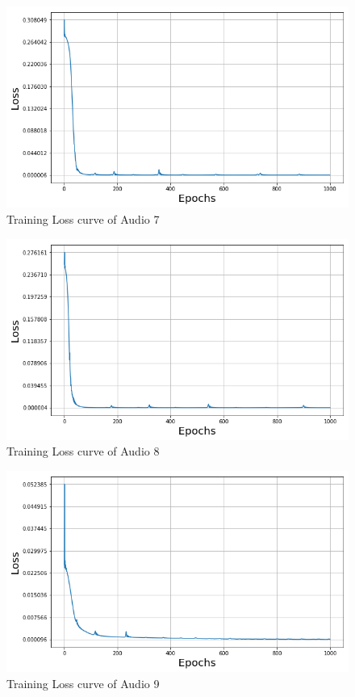 \documentclass{ioereport}
\begin{document}
    \begin{figure}[H]
        \centering
        \includegraphics[width=\linewidth]{assets/audio_loss_curves/multitone_a4e4.png}
        \caption{Training Loss curve of Audio 7}
        \label{fig:audio-loss-curve-7}
    \end{figure}
    \begin{figure}[H]
        \centering
        \includegraphics[width=\linewidth]{assets/audio_loss_curves/multitone_beats.png}
        \caption{Training Loss curve of Audio 8}
        \label{fig:audio-loss-curve-8}
    \end{figure}
    \begin{figure}[H]
        \centering
        \includegraphics[width=\linewidth]{assets/audio_loss_curves/06seconds.png}
        \caption{Training Loss curve of Audio 9}
        \label{fig:audio-loss-curve-9}
    \end{figure}
\end{document}
